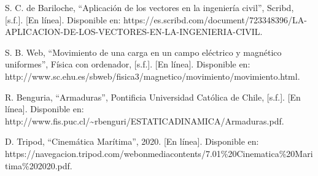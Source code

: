 \documentclass[conference]{IEEEtran}
\begin{document}
\begin{thebibliography}{20}
S. C. de Bariloche, ``Aplicación de los vectores en la ingeniería civil'', Scribd, [s.f.]. [En línea]. Disponible en: https://es.scribd.com/document/723348396/LA-APLICACION-DE-LOS-VECTORES-EN-LA-INGENIERIA-CIVIL.

S. B. Web, ``Movimiento de una carga en un campo eléctrico y magnético uniformes'', Física con ordenador, [s.f.]. [En línea]. Disponible en: http://www.sc.ehu.es/sbweb/fisica3/magnetico/movimiento/movimiento.html.

R. Benguria, ``Armaduras'', Pontificia Universidad Católica de Chile, [s.f.]. [En línea]. Disponible en: http://www.fis.puc.cl/\~{}rbenguri/ESTATICADINAMICA/Armaduras.pdf.

D. Tripod, ``Cinemática Marítima'', 2020. [En línea]. Disponible en: https://navegacion.tripod.com/webonmediacontents/7.01\%20Cinematica\%20Maritima\%202020.pdf.

\end{thebibliography}
\end{document}
